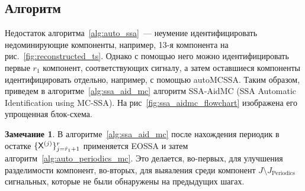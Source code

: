 \documentclass[specialist,
substylefile = spbu_report.rtx,
subf,12pt]{disser}
\theoremstyle{definition}
\newtheorem{remark}{Замечание}[chapter]
\begin{document}
\subsection{Алгоритм}

Недостаток алгоритма~\ref{alg:auto_ssa}~--- неумение идентифицировать недоминирующие компоненты, например, 13-я компонента на рис.~\ref{fig:reconstructed_ts}. Однако с помощью него можно идентифицировать первые $r_1$ компонент, соответствующих сигналу, а затем оставшиеся компоненты идентифицировать отдельно, например, с помощью autoMCSSA. Таким образом, приведем в алгоритме~\ref{alg:ssa_aid_mc} алгоритм SSA-AidMC (SSA Automatic Identification using MC-SSA). На рис~\ref{fig:ssa_aidmc_flowchart} изображена его упрощенная блок-схема.

\begin{remark}
	В алгоритме~\ref{alg:ssa_aid_mc} после нахождения периодик в остатке $\{\mathsf{X}^{(j)}\}_{j=\hat{r}_1 + 1}^r$ применяется EOSSA и затем алгоритм~\ref{alg:auto_periodics_mc}. Это делается, во-первых, для улучшения разделимости компонент, во-вторых, для выяаления среди компонент $J \setminus J_\text{Periodics}$ сигнальных, которые не были обнаружены на предыдущих шагах. 
\end{remark}
\end{document}
